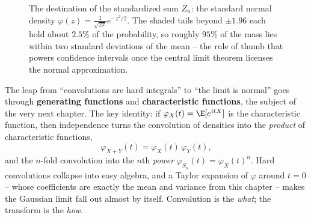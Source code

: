 \begin{figure}[H]
\centering
{}
\caption{The destination of the standardized sum $Z_n$: the standard normal
density $\varphi(z)=\frac{1}{\sqrt{2\pi}}e^{-z^2/2}$. The shaded tails beyond
$\pm 1.96$ each hold about $2.5\%$ of the probability, so roughly $95\%$ of
the mass lies within two standard deviations of the mean -- the rule of thumb
that powers confidence intervals once the central limit theorem licenses the
normal approximation.}
\label{ch17:fig-bell}
\end{figure}

\begin{connectionbox}
The leap from ``convolutions are hard integrals'' to ``the limit is
normal'' goes through \textbf{generating functions} and
\textbf{characteristic functions}, the subject of the very next chapter.
The key identity: if $\varphi_X(t)=\E[e^{itX}]$ is the characteristic
function, then independence turns the convolution of densities into the
\emph{product} of characteristic functions,
\[
\varphi_{X+Y}(t)=\varphi_X(t)\,\varphi_Y(t),
\]
and the $n$-fold convolution into the $n$th \emph{power}
$\varphi_{S_n}(t)=\varphi_X(t)^n$. Hard convolutions collapse into easy
algebra, and a Taylor expansion of $\varphi$ around $t=0$ -- whose
coefficients are exactly the mean and variance from this chapter -- makes
the Gaussian limit fall out almost by itself. Convolution is the
\emph{what}; the transform is the \emph{how}.
\end{connectionbox}

